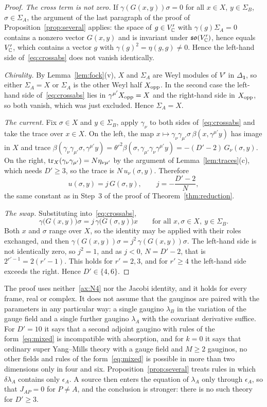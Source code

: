 \begin{proof}
\emph{The cross term is not zero.} If $\gamma(G(x,y))\sigma=0$ for all $x\in X$, $y\in\Sigma_B$, $\sigma\in\Sigma_A$, the argument of the last paragraph of the proof of Proposition~\ref{prop:several} applies: the space of $g\in V'_{\mathbb{C}}$ with $\gamma(g)\Sigma_A=0$ contains a nonzero vector $G(x,y)$ and is invariant under $\mathfrak{so}(V'_{\mathbb{C}})$, hence equals $V'_{\mathbb{C}}$, which contains a vector $g$ with $\gamma(g)^2=\eta(g,g)\ne0$. Hence the left-hand side of~\eqref{eq:crossabs} does not vanish identically.

\emph{Chirality.} By Lemma~\ref{lem:fock}(v), $X$ and $\Sigma_A$ are Weyl modules of $V'$ in $\Delta_{\mathbf 1}$, so either $\Sigma_A=X$ or $\Sigma_A$ is the other Weyl half $X_{\rm opp}$. In the second case the left-hand side of~\eqref{eq:crossabs} lies in $\gamma^{\mu'}X_{\rm opp}=X$ and the right-hand side in $X_{\rm opp}$, so both vanish, which was just excluded. Hence $\Sigma_A=X$.

\emph{The current.} Fix $\sigma\in X$ and $y\in\Sigma_B$, apply $\gamma_\nu$ to both sides of~\eqref{eq:crossabs} and take the trace over $x\in X$. On the left, the map $x\mapsto\gamma_\nu\gamma_{\mu'}\sigma\,\beta(x,\gamma^{\mu'}y)$ has image in $X$ and trace $\beta(\gamma_\nu\gamma_{\mu'}\sigma,\gamma^{\mu'}y)=\theta'^2\beta(\sigma,\gamma_{\mu'}\gamma_\nu\gamma^{\mu'}y)=-(D'-2)\,G_\nu(\sigma,y)$. On the right, $\operatorname{tr}_X(\gamma_\nu\gamma_{\mu'})=N\eta_{\nu\mu'}$ by the argument of Lemma~\ref{lem:traces}(c), which needs $D'\ge3$, so the trace is $N\,u_\nu(\sigma,y)$. Therefore
\[
u(\sigma,y)=j\,G(\sigma,y),\qquad j=-\frac{D'-2}{N},
\]
the same constant as in Step~3 of the proof of Theorem~\ref{thm:reduction}.

\emph{The swap.} Substituting into~\eqref{eq:crossabs},
\[
\gamma\bigl(G(x,y)\bigr)\sigma=j\,\gamma\bigl(G(\sigma,y)\bigr)x\qquad\text{for all }x,\sigma\in X,\ y\in\Sigma_B .
\]
Both $x$ and $\sigma$ range over $X$, so the identity may be applied with their roles exchanged, and then $\gamma(G(x,y))\sigma=j^2\,\gamma(G(x,y))\sigma$. The left-hand side is not identically zero, so $j^2=1$, and as $j<0$, $N=D'-2$, that is $2^{r'-1}=2(r'-1)$. This holds for $r'=2,3$, and for $r'\ge4$ the left-hand side exceeds the right. Hence $D'\in\{4,6\}$.
\end{proof}

The proof uses neither~\ref{ax:N4} nor the Jacobi identity, and it holds for every frame, real or complex. It does not assume that the gauginos are paired with the parameters in any particular way: a single gaugino $\lambda_B$ in the variation of the gauge field and a single further gaugino $\lambda_A$ with the covariant derivative suffice. For $D'=10$ it says that a second adjoint gaugino with rules of the form~\eqref{eq:mixed} is incompatible with absorption, and for $k=0$ it says that ordinary super Yang--Mills theory with a gauge field and $M\ge2$ gauginos, no other fields and rules of the form~\eqref{eq:mixed} is possible in more than two dimensions only in four and six. Proposition~\ref{prop:several} treats rules in which $\delta\lambda_A$ contains only $\epsilon_A$. A source then enters the equation of $\lambda_A$ only through $\epsilon_A$, so that $J_{AP}=0$ for $P\ne A$, and the conclusion is stronger: there is no such theory for $D'\ge3$.

